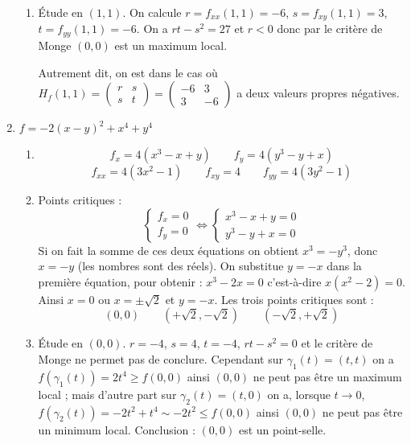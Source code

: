 \documentclass[11pt,a4paper]{article}
\renewcommand{\ge}{\geqslant} \renewcommand{\geq}{\geqslant}
\renewcommand{\le}{\leqslant} \renewcommand{\leq}{\leqslant}
\theoremstyle{exostyle}
\begin{document}
\begin{enumerate}
\begin{enumerate}
	
	\item Étude en $(1,1)$.
	On calcule $r=f_{xx}(1,1) = -6$, $s=f_{xy}(1,1) = 3$, $t=f_{yy}(1,1) = -6$.
	On a $rt-s^2 = 27$ et $r<0$ donc par le critère de Monge $(0,0)$ est un maximum local.
	
	Autrement dit, on est dans le cas où $H_f(1,1) = \begin{pmatrix}r&s\\s&t\end{pmatrix}=\begin{pmatrix}-6&3\\3&-6\end{pmatrix}$
	a deux valeurs propres négatives.
	 
	\end{enumerate}
	
	\item $f= -2(x-y)^2+x^4+y^4$
	
	\begin{enumerate}
	\item	
	
	\[
	f_x = 4(x^3-x+y)
	\qquad
	f_y = 4(y^3-y+x)
	\]
	\[
	f_{xx} = 4(3x^2-1)
	\qquad 
	f_{xy}= 4
	\qquad 
	f_{yy}= 4(3y^2-1)
	\]
	
	\item Points critiques :
	\[
	\left\{
	\begin{array}{l}
		f_x = 0 \\
		f_y = 0 
	\end{array}
	\right.
	\iff
	\left\{
	\begin{array}{l}
		x^3-x+y = 0 \\
		y^3-y+x = 0 
	\end{array}
	\right.	
	\]
	Si on fait la somme de ces deux équations on obtient $x^3=-y^3$, donc $x=-y$ (les nombres sont des réels).
	On substitue $y=-x$ dans la première équation, pour obtenir : $x^3-2x=0$ c'est-à-dire $x(x^2-2)=0$.
	Ainsi $x=0$ ou $x=\pm\sqrt2$ et $y=-x$.
	Les trois points critiques sont :
	\[
	(0,0) \qquad (+\sqrt2,-\sqrt2) \qquad (-\sqrt2,+\sqrt2)
	\]
	
	\item Étude en $(0,0)$.
	$r= -4$, $s=4$, $t=-4$, $rt-s^2 = 0$ et le critère de Monge ne permet pas de conclure.
	Cependant sur $\gamma_1(t) = (t,t)$ on a $f(\gamma_1(t))= 2t^4 \ge f(0,0)$ ainsi $(0,0)$ ne peut pas être un maximum local ; mais d'autre part sur $\gamma_2(t) = (t,0)$ on a, lorsque $t\to0$, $f(\gamma_2(t))= -2t^2+t^4 \sim -2t^2 \le f(0,0)$ ainsi $(0,0)$ ne peut pas être un minimum local. Conclusion : $(0,0)$ est un point-selle.
	

\end{enumerate}
\end{enumerate}
\end{document}
